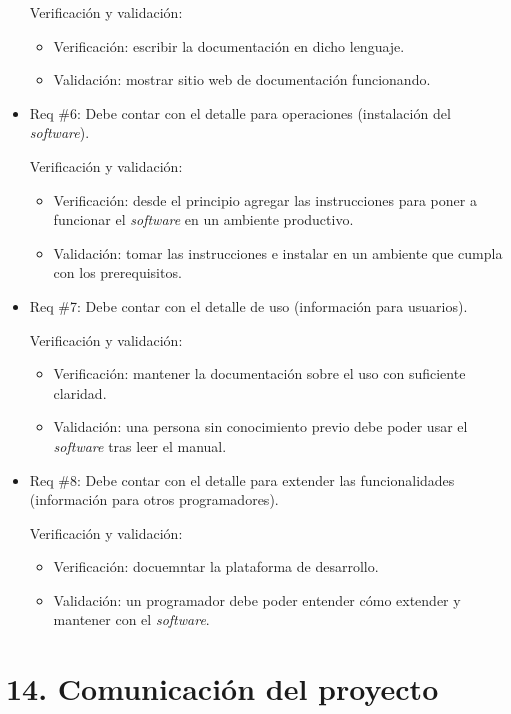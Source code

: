 \documentclass[11pt]{charter}
\begin{document}
\begin{itemize}
Verificación y validación:
\begin{itemize}
  \item Verificación: escribir la documentación en dicho lenguaje.
  \item Validación: mostrar sitio web de documentación funcionando.
\end{itemize}

\item Req \#6: Debe contar con el detalle para operaciones (instalación del \textit{software}).

Verificación y validación:
\begin{itemize}
  \item Verificación: desde el principio agregar las instrucciones para poner a funcionar el \textit{software}
  en un ambiente productivo. 
  \item Validación: tomar las instrucciones e instalar en un ambiente que cumpla con los prerequisitos.  
\end{itemize}

\item Req \#7: Debe contar con el detalle de uso (información para usuarios).

Verificación y validación:
\begin{itemize}
  \item Verificación: mantener la documentación sobre el uso con suficiente claridad.
  \item Validación: una persona sin conocimiento previo debe poder usar el \textit{software} tras leer el manual.
\end{itemize}

\item Req \#8: Debe contar con el detalle para extender las funcionalidades (información para otros programadores).

Verificación y validación:
\begin{itemize}
  \item Verificación: docuemntar la plataforma de desarrollo.
  \item Validación: un programador debe poder entender cómo extender y mantener con el \textit{software}.
\end{itemize}

\end{itemize}

\section{14. Comunicación del proyecto}
\label{sec:comunicaciones}
\end{document}
